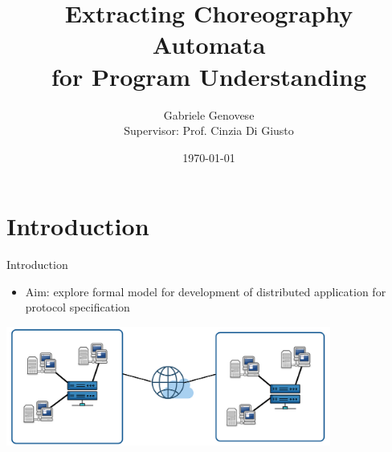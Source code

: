 \documentclass{beamer}
\title{Extracting Choreography Automata \\ for Program Understanding}
\author{Gabriele Genovese \\ Supervisor: Prof. Cinzia Di Giusto}
\date{\today}
\begin{document}
\frame{\titlepage}

%


\section{Introduction}
\begin{frame}{Introduction}
\begin{itemize}
    \item Aim: explore formal model for development of 
    distributed application for protocol specification
\end{itemize}
\begin{center}
\includegraphics[width=0.8\textwidth]{images/crop.png}
\end{center}
\end{frame}
\end{document}
